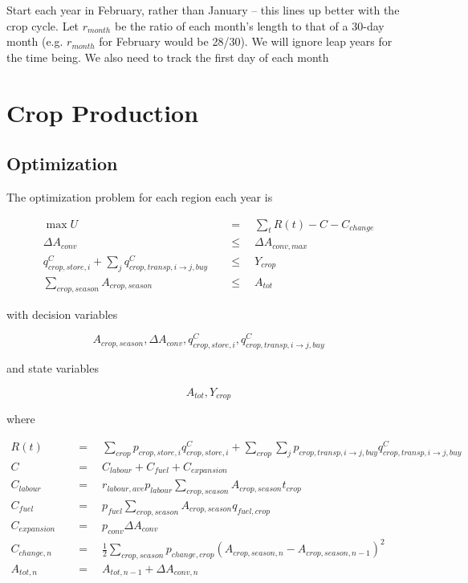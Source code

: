 \documentclass[letter,12pt]{article}
\begin{document}
Start each year in February, rather than January -- this lines up better with the crop cycle.  Let $r_{month}$ be the ratio of each month's length to that of a 30-day month (e.g. $r_{month}$ for February would be 28/30).  We will ignore leap years for the time being.  We also need to track the first day of each month

\section{Crop Production}

\subsection{Optimization}
The optimization problem for each region each year is

\begin{align}
\max U \quad &= \quad  \sum_t R\left(t\right) - C - C_{change} \label{crop utility fcn}\\
\Delta A_{conv} \quad &\leq \quad  \Delta A_{conv,max} \label{land conv con} \\
q_{crop,store,i}^C + \sum_j q_{crop,transp,i \rightarrow j,buy}^C \quad &\leq \quad  Y_{crop}  \label{crop sale con} \\
\sum_{crop,season} A_{crop,season} \quad &\leq \quad  A_{tot} \label{land area con}
\end{align}

\noindent with decision variables

\begin{equation}
A_{crop,season},\Delta A_{conv},q_{crop,store,i}^C,q_{crop,transp,i\rightarrow j,buy}^C
\end{equation}

\noindent and state variables

\begin{equation}
A_{tot}, Y_{crop}
\end{equation}

\noindent where

\begin{align}
R\left(t\right) \quad &= \quad  \sum_{crop} p_{crop,store,i} q_{crop,store,i}^C + \sum_{crop} \sum_j p_{crop,transp,i\rightarrow j,buy} q_{crop,transp,i\rightarrow j,buy}^C \\
C \quad &= \quad  C_{labour} + C_{fuel} + C_{expansion} \\
C_{labour} \quad &= \quad  r_{labour,ave} p_{labour} \sum_{crop,season} A_{crop,season} t_{crop} \\
C_{fuel} \quad &= \quad  p_{fuel} \sum_{crop,season} A_{crop,season} q_{fuel,crop} \\
C_{expansion} \quad &= \quad  p_{conv} \Delta A_{conv} \\
C_{change,n} \quad &= \quad  \frac{1}{2} \sum_{crop,season} p_{change,crop} \left( A_{crop,season,n} - A_{crop,season,n-1} \right)^2 \\
A_{tot,n} \quad &= \quad  A_{tot,n-1} + \Delta A_{conv,n} \label{crop area increment}
\end{align}
\end{document}

